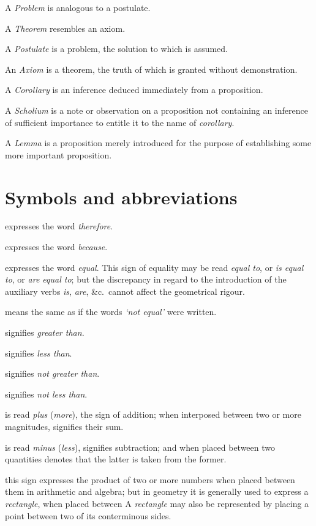 \documentclass{byrne-book}
\begin{document}
A \emph{Problem} is analogous to a postulate.

A \emph{Theorem} resembles an axiom.

A \emph{Postulate} is a problem, the solution to which is assumed.

An \emph{Axiom} is a theorem, the truth of which is granted without demonstration.

A \emph{Corollary} is an inference deduced immediately from a proposition.

A \emph{Scholium} is a note or observation on a proposition not containing an inference of sufficient importance to entitle it to the name of \emph{corollary}.

A \emph{Lemma} is a proposition merely introduced for the purpose of establishing some more important proposition.


\chapter*{Symbols and abbreviations}

\symb{$\therefore$}
expresses the word \emph{therefore}.

\symb{$\because$}
 expresses the word \emph{because}.

\symb{$=$}
 expresses the word \emph{equal}. This sign of equality may be read \emph{equal to}, or \emph{is equal to}, or \emph{are equal to}; but the discrepancy in regard to the introduction of the auxiliary verbs \emph{is}, \emph{are}, \&c.\ cannot affect the geometrical rigour.

\symb{$\neq$}
 means the same as if the words \emph{‘not equal’} were written.

\symb{$>$}
 signifies \emph{greater than}.

\symb{$<$}
 signifies \emph{less than}.

\symb{$\ngtr$}
 signifies \emph{not greater than}.

\symb{$\nless$}
 signifies \emph{not less than}.

\symb{$+$}
 is read \emph{plus} (\emph{more}), the sign of addition; when interposed between two or more magnitudes, signifies their sum.

\symb{$-$}
 is read \emph{minus} (\emph{less}), signifies subtraction; and when placed between two quantities denotes that the latter is taken from the former.

\symb{$\times$}
 this sign expresses the product of two or more numbers when placed between them in arithmetic and algebra; but in geometry it is generally used to express a \emph{rectangle}, when placed between  A \emph{rectangle} may also be represented by placing a point between two of its conterminous sides.
\end{document}
